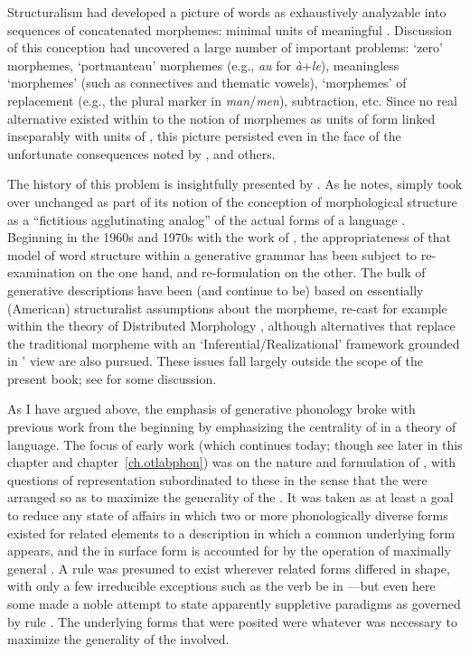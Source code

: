 Structuralism had developed a picture of words as exhaustively
analyzable into sequences of concatenated morphemes: minimal units of
meaningful . Discussion of this conception had
uncovered a large number of important problems: `zero' morphemes,
`portmanteau' morphemes (e.g.,  \emph{au} for
\emph{à}+\emph{le}), meaningless `morphemes' (such as connectives and
thematic vowels), `morphemes' of replacement (e.g., the plural marker
in \emph{man}/\emph{men}), subtraction, etc. Since no real alternative
existed within  to the notion of morphemes as units of
form linked inseparably with units of , this picture persisted
even in the face of the unfortunate consequences noted by
\citet{hockett47:survey}, \citet{nida:identification} and others.

The history of this problem is insightfully presented by
\citet{matthews72:infl,matthews93:grammatical_theory}. As he notes,
 simply took over unchanged as part of its notion of
 the conception of morphological structure as
a ``fictitious agglutinating analog'' of the actual forms of a
language \citep[as][put it]{lounsbury53:oneida_verb}. Beginning in the 1960s and
1970s with the work of \citet{matthews65:wp,matthews72:infl}, the
appropriateness of that model of word structure within a generative
grammar has been subject to re-examination on the one hand, and
re-formulation on the other. The bulk of generative descriptions have
been (and continue to be) based on essentially (American)
structuralist assumptions about the morpheme, re-cast for example
within the theory of  Distributed Morphology
\citep{halle.marantz93:bldg20}, although alternatives that replace the
traditional morpheme with an `Inferential/Realizational' framework
\citep{stump01:inflect.morph.book} grounded in {\MatthewsP}' view are also
pursued. These issues fall largely outside the scope of the present
book; see \citealt{sra12:the-morpheme} for some discussion.

As I have argued above, the emphasis of generative phonology broke
with previous work from the beginning by emphasizing the centrality of
 in a theory of language. The focus of early work (which
continues today; though see later in this chapter and
chapter~\ref{ch.otlabphon}) was on the nature and formulation of
, with questions of representation subordinated to these in the
sense that the  were arranged so as to maximize the
generality of the . It was taken as at least a goal to reduce any
state of affairs in which two or more phonologically diverse forms
existed for related elements to a description in which a common
underlying form appears, and the  in surface form is
accounted for by the operation of maximally general . A rule was
presumed to exist wherever related forms differed in shape, with only
a few irreducible exceptions such as the verb be in —but even
here some made a noble attempt to state apparently suppletive
paradigms as governed by rule \citep[e.g.][]{foley65:sum}. The
underlying forms that were posited were whatever was necessary to
maximize the generality of the  involved.

